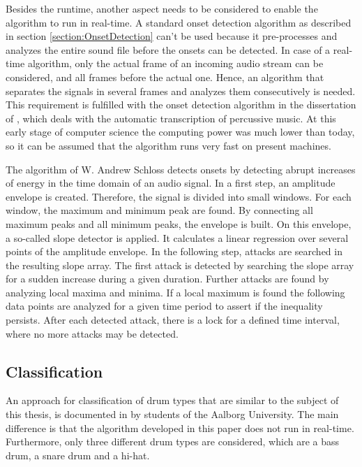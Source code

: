 Besides the runtime, another aspect needs to be considered to enable the algorithm to run in real-time. A standard onset detection algorithm as described in section \ref{section:OnsetDetection} can't be used because it pre-processes and analyzes the entire sound file before the onsets can be detected. In case of a real-time algorithm, only the actual frame of an incoming audio stream can be considered, and all frames before the actual one. Hence, an algorithm that separates the signals in several frames and analyzes them consecutively is needed. This requirement is fulfilled with the onset detection algorithm in the dissertation of \autocite{Schloss:1985}, which deals with the automatic transcription of percussive music. At this early stage of computer science the computing power was much lower than today, so it can be assumed that the algorithm runs very fast on present machines. 

The algorithm of W. Andrew Schloss detects onsets by detecting abrupt increases of energy in the time domain of an audio signal. In a first step, an amplitude envelope is created. Therefore, the signal is divided into small windows. For each window, the maximum and minimum peak are found. By connecting all maximum peaks and all minimum peaks, the envelope is built. On this envelope, a so-called slope detector is applied. It calculates a linear regression over several points of the amplitude envelope. In the following step, attacks are searched in the resulting slope array. The first attack is detected by searching the slope array for a sudden increase during a given duration. Further attacks are found by analyzing local maxima and minima. If a local maximum is found the following data points are analyzed for a given time period to assert if the inequality persists. After each detected attack, there is a lock for a defined time interval, where no more attacks may be detected.

\subsection{Classification} \label{section:ClassificationChristophersen}

An approach for classification of drum types that are similar to the subject of this thesis, is documented in \autocite{Christophersen:2007} by students of the Aalborg University. The main difference is that the algorithm developed in this paper does not run in real-time. Furthermore, only three different drum types are considered, which are a bass drum, a snare drum and a hi-hat. 

